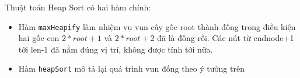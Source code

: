 \documentclass[a4paper]{article}
\newcommand{\mnt}[1]{\inputminted[frame=single, linenos=true, tabsize=4]{c++}{#1}}
\begin{document}
Thuật toán Heap Sort có hai hàm chính:

\begin{itemize}
\item Hàm \texttt{maxHeapify} làm nhiệm vụ vun cây gốc root thành đống trong điều kiện hai gốc con $2*root+1$ và $2*root+2$ đã là đống rồi. Các nút từ endnode+1 tới len-1 đã nằm đúng vị trí, không được tính tới nữa.
\item Hàm \texttt{heapSort} mô tả lại quá trình vun đống theo ý tưởng trên
\end{itemize}
\pagebreak
\mnt{src/heapsort.cpp}
\end{document}
